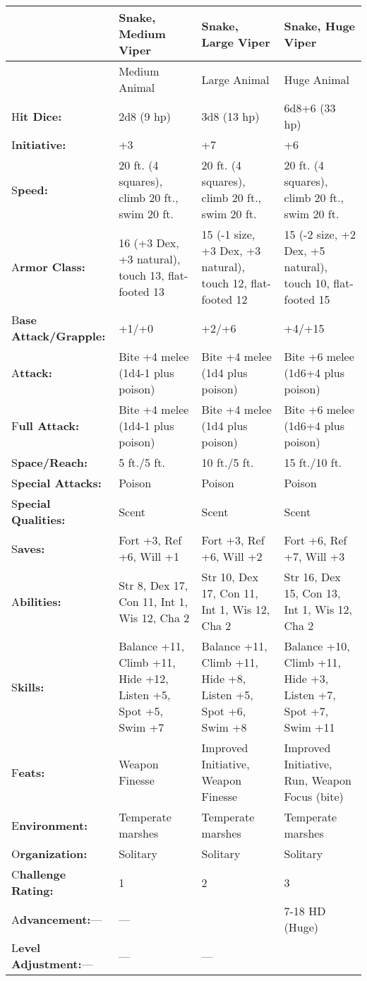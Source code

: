 \documentclass{article}
\begin{document}
\vspace{12pt}
\begin{tabular}{|>{\raggedright}p{52pt}|>{\raggedright}p{83pt}|>{\raggedright}p{83pt}|>{\raggedright}p{83pt}|}
\hline
  & S\textbf{nake, Medium Viper} & S\textbf{nake, Large Viper} & S\textbf{nake, 
Huge Viper}\tabularnewline
\hline
  & Medium Animal & Large Animal & Huge Animal\tabularnewline
\hline
H\textbf{it Dice:} & 2d8 (9 hp) & 3d8 (13 hp) & 6d8+6 (33 hp)\tabularnewline
\hline
I\textbf{nitiative:} & +3 & +7 & +6\tabularnewline
\hline
S\textbf{peed:} & 20 ft. (4 squares), climb 20 ft., swim 20 ft. & 20 ft. (4 squares), 
climb 20 ft., swim 20 ft. & 20 ft. (4 squares), climb 20 ft., swim 20 ft.\tabularnewline
\hline
A\textbf{rmor Class:} & 16 (+3 Dex, +3 natural), touch 13, flat-footed 13 & 15 
(-1 size, +3 Dex, +3 natural), touch 12, flat-footed 12 & 15 (-2 size, +2 Dex, 
+5 natural), touch 10, flat-footed 15\tabularnewline
\hline
B\textbf{ase Attack/Grapple:} & +1/+0 & +2/+6 & +4/+15\tabularnewline
\hline
A\textbf{ttack:} & Bite +4 melee (1d4-1 plus poison) & Bite +4 melee (1d4 plus 
poison) & Bite +6 melee (1d6+4 plus poison)\tabularnewline
\hline
F\textbf{ull Attack:} & Bite +4 melee (1d4-1 plus poison) & Bite +4 melee (1d4 
plus poison) & Bite +6 melee (1d6+4 plus poison)\tabularnewline
\hline
S\textbf{pace/Reach:} & 5 ft./5 ft. & 10 ft./5 ft. & 15 ft./10 ft.\tabularnewline
\hline
S\textbf{pecial Attacks:} & Poison & Poison & Poison\tabularnewline
\hline
S\textbf{pecial Qualities:} & Scent & Scent & Scent\tabularnewline
\hline
S\textbf{aves:} & Fort +3, Ref +6, Will +1 & Fort +3, Ref +6, Will +2 & Fort +6, 
Ref +7, Will +3\tabularnewline
\hline
A\textbf{bilities:} & Str 8, Dex 17, Con 11, Int 1, Wis 12, Cha 2 & Str 10, Dex 
17, Con 11, Int 1, Wis 12, Cha 2 & Str 16, Dex 15, Con 13, Int 1, Wis 12, Cha 2\tabularnewline
\hline
S\textbf{kills:} & Balance +11, Climb +11, Hide +12, Listen +5, Spot +5, Swim +7 & Balance 
+11, Climb +11, Hide +8, Listen +5, Spot +6, Swim +8 & Balance +10, Climb +11, 
Hide +3, Listen +7, Spot +7, Swim +11\tabularnewline
\hline
F\textbf{eats:} & Weapon Finesse & Improved Initiative, Weapon Finesse & Improved 
Initiative, Run, Weapon Focus (bite)\tabularnewline
\hline
E\textbf{nvironment:} & Temperate marshes & Temperate marshes & Temperate marshes\tabularnewline
\hline
O\textbf{rganization:} & Solitary & Solitary & Solitary\tabularnewline
\hline
C\textbf{hallenge Rating:} & 1 & 2 & 3\tabularnewline
\hline
A\textbf{dvancement:}--- & --- &  & 7-18 HD (Huge)\tabularnewline
\hline
L\textbf{evel Adjustment:}--- & --- & --- & \tabularnewline
\hline
\end{tabular}
\end{document}
